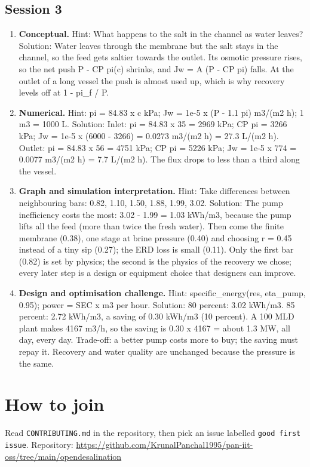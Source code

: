 \documentclass[11pt,a4paper]{article}
\begin{document}
\subsection*{Session 3}
\begin{enumerate}[nosep]
\item \textbf{Conceptual.} Hint: What happens to the salt in the channel as water leaves? Solution: Water leaves through the membrane but the salt stays in the channel, so the feed gets saltier towards the outlet. Its osmotic pressure rises, so the net push P - CP pi(c) shrinks, and Jw = A (P - CP pi) falls. At the outlet of a long vessel the push is almost used up, which is why recovery levels off at 1 - pi\_f / P.
\item \textbf{Numerical.} Hint: pi = 84.83 x c kPa; Jw = 1e-5 x (P - 1.1 pi) m3/(m2 h); 1 m3 = 1000 L. Solution: Inlet: pi = 84.83 x 35 = 2969 kPa; CP pi = 3266 kPa; Jw = 1e-5 x (6000 - 3266) = 0.0273 m3/(m2 h) = 27.3 L/(m2 h). Outlet: pi = 84.83 x 56 = 4751 kPa; CP pi = 5226 kPa; Jw = 1e-5 x 774 = 0.0077 m3/(m2 h) = 7.7 L/(m2 h). The flux drops to less than a third along the vessel.
\item \textbf{Graph and simulation interpretation.} Hint: Take differences between neighbouring bars: 0.82, 1.10, 1.50, 1.88, 1.99, 3.02. Solution: The pump inefficiency costs the most: 3.02 - 1.99 = 1.03 kWh/m3, because the pump lifts all the feed (more than twice the fresh water). Then come the finite membrane (0.38), one stage at brine pressure (0.40) and choosing r = 0.45 instead of a tiny sip (0.27); the ERD loss is small (0.11). Only the first bar (0.82) is set by physics; the second is the physics of the recovery we chose; every later step is a design or equipment choice that designers can improve.
\item \textbf{Design and optimisation challenge.} Hint: specific\_energy(res, eta\_pump, 0.95); power = SEC x m3 per hour. Solution: 80 percent: 3.02 kWh/m3. 85 percent: 2.72 kWh/m3, a saving of 0.30 kWh/m3 (10 percent). A 100 MLD plant makes 4167 m3/h, so the saving is 0.30 x 4167 = about 1.3 MW, all day, every day. Trade-off: a better pump costs more to buy; the saving must repay it. Recovery and water quality are unchanged because the pressure is the same.
\end{enumerate}

\section{How to join}
Read \texttt{CONTRIBUTING.md} in the repository, then pick an issue labelled \texttt{good first issue}. Repository: \url{https://github.com/KrunalPanchal1995/pan-iit-oss/tree/main/opendesalination}
\end{document}
